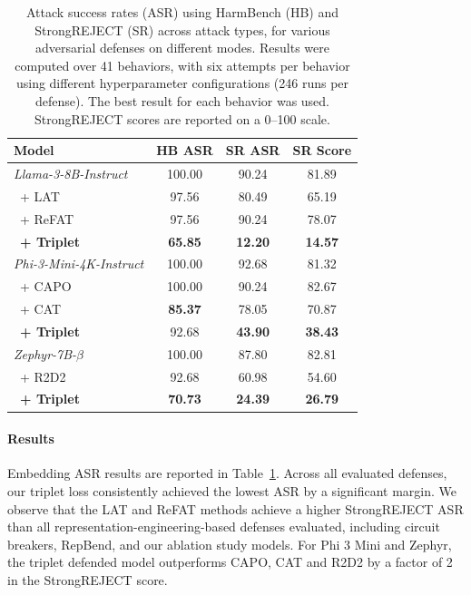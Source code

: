 \documentclass[11pt]{article}
\begin{document}
\begin{table}[tb]
\centering
\begin{tabular}{lccc}
\hline
Model &  HB ASR &  SR ASR &  SR Score \\
\hline
\textit{Llama-3-8B-Instruct}                 &           100.00 &             90.24 &               81.89 \\
\ + LAT                  &            97.56 &             80.49 &               65.19 \\
\ + ReFAT &      97.56 &             90.24 &                78.07 \\

\ \textbf{+ Triplet} &  \textbf{65.85} & \textbf{12.20} & \textbf{14.57} \\
\hline
\textit{Phi-3-Mini-4K-Instruct}    &           100.00 &             92.68 &               81.32 \\
\ + CAPO    &           100.00 &             90.24 &               82.67 \\
\ + CAT     &           \textbf{85.37} &             78.05 &               70.87 \\
\ \textbf{+ Triplet} &            92.68 &             \textbf{43.90} &               \textbf{38.43} \\
\hline
\textit{Zephyr-7B-$\beta$} &           100.00 &             87.80 &               82.81 \\
\ + R2D2           &            92.68 &             60.98 &               54.60 \\
\ \textbf{+ Triplet} &            \textbf{70.73} &             \textbf{24.39} &               \textbf{26.79} \\
\hline
\end{tabular}
\caption{Attack success rates (ASR) using HarmBench (HB) and StrongREJECT (SR) across attack types, for various adversarial defenses on different modes.
Results were computed over 41 behaviors, with six attempts per behavior using different hyperparameter configurations (246 runs per defense). The best result for each behavior was used. StrongREJECT scores are reported on a 0--100 scale.
}
\label{tab:comparison_asr_all}
\end{table}

\paragraph{Results}
Embedding ASR results are reported in Table~\ref{tab:comparison_asr_all}.
Across all evaluated defenses, our triplet loss consistently achieved the lowest ASR by a significant margin. We observe that the LAT and ReFAT methods achieve a higher StrongREJECT ASR than all representation-engineering-based defenses evaluated, including circuit breakers, RepBend, and our ablation study models.
For Phi 3 Mini and Zephyr, the triplet defended model outperforms CAPO, CAT and R2D2 by a factor of 2 in the StrongREJECT score.
\end{document}

